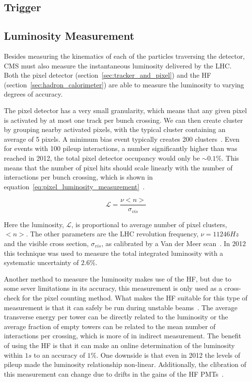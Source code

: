 \subsection{Trigger}
\subsection{Luminosity Measurement}

Besides measuring the kinematics of each of the particles traversing the detector, CMS must also measure the instantaneous luminosity delivered by the LHC. Both the pixel detector (section~\ref{sec:tracker_and_pixel}) and the HF (section~\ref{sec:hadron_calorimeter}) are able to measure the luminosity to varying degrees of accuracy.

The pixel detector has a very small granularity, which means that any given pixel is activated by at most one track per bunch crossing. We can then create cluster by grouping nearby activated pixels, with the typical cluster containing an average of 5 pixels. A minimum bias event typically creates 200 clusters~\cite{CMS-PAS-LUM-12-001}. Even for events with 100 pileup interactions, a number significantly higher than was reached in 2012, the total pixel detector occupancy would only be $\sim0.1\%$. This means that the number of pixel hits should scale linearly with the number of interactions per bunch crossing, which is shown in equation~\ref{eq:pixel_luminosity_measurement}~\cite{CMS-PAS-LUM-13-001}.

\begin{equation}
\mathcal{L}=\frac{\nu<n>}{\sigma_{vis}}
\label{eq:pixel_luminosity_measurement}
\end{equation}

Here the luminosity, $\mathcal{L}$, is proportional to average number of pixel clusters, $<n>$. The other parameters are the LHC revolution frequency, $\nu=11246\unit{Hz}$ and the visible cross section, $\sigma_{vis}$, as calibrated by a Van der Meer scan~\cite{Balagura:2011yw}. In 2012 this technique was used to measure the total integrated luminosity with a systematic uncertainty of $2.6\%$.

Another method to measure the luminosity makes use of the HF, but due to some sever limitations in its accuracy, this measurement is only used as a cross-check for the pixel counting method. What makes the HF suitable for this type of measurement is that it can safely be run during unstable beams~\cite{CMS-PAS-LUM-13-001}. The average transverse energy per tower can be directly related to the luminosity or the average fraction of empty towers can be related to the mean number of interactions per crossing, which is more of in indirect measurement. The benefit of using the HF is that it can make an online determination of the luminosity within $1\unit{s}$ to an accuracy of $1\%$. One downside is that even in 2012 the levels of pileup made the luminosity relationship non-linear. Additionally, the clibration of this measurement can change due to drifts in the gains of the HF PMTs~\cite{Pedro2014}.